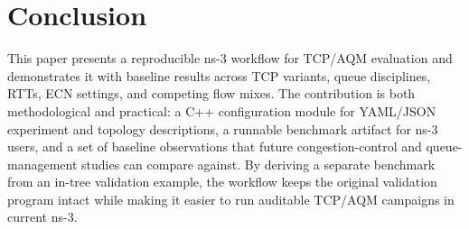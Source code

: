\section{Conclusion}

This paper presents a reproducible ns-3 workflow for TCP/AQM evaluation and demonstrates it with baseline results across TCP variants, queue disciplines, RTTs, ECN settings, and competing flow mixes. The contribution is both methodological and practical: a C++ configuration module for YAML/JSON experiment and topology descriptions, a runnable benchmark artifact for ns-3 users, and a set of baseline observations that future congestion-control and queue-management studies can compare against. By deriving a separate benchmark from an in-tree validation example, the workflow keeps the original validation program intact while making it easier to run auditable TCP/AQM campaigns in current ns-3.

